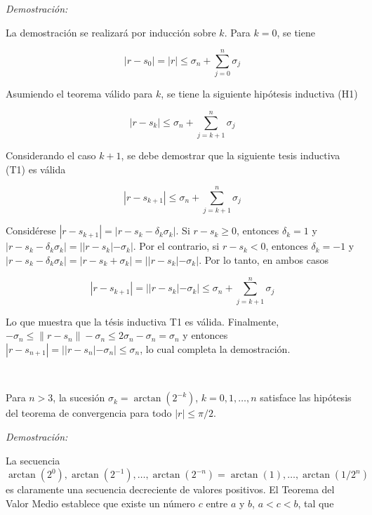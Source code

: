 \emph{Demostración:}

La demostración se realizará por inducción sobre $k$. Para $k=0$, se tiene

\begin{equation*}
|r-s_0|=|r| \le \sigma_{n}+\sum_{j=0}^{n}{\sigma_j}
\end{equation*}

Asumiendo el teorema válido para $k$, se tiene la siguiente hipótesis inductiva (H1)

\begin{equation*}
|r-s_k| \le \sigma_{n} + \sum_{j=k+1}^{n}{\sigma_j}
\end{equation*}

Considerando el caso $k+1$, se debe demostrar que la siguiente tesis inductiva (T1) es válida

\begin{equation*}
|r-s_{k+1}| \le \sigma_{n} + \sum_{j=k+1}^{n}{\sigma_j}
\end{equation*}

Considérese $|r-s_{k+1}|= |r-s_k-\delta_k\sigma_k|$. Si $r-s_k \ge 0$, entonces $\delta_k=1$ y
$|r-s_k-\delta_k\sigma_k|=||r-s_k|-\sigma_k|$. Por el contrario, si $r-s_k < 0$, entonces $\delta_k=-1$ y
$|r-s_k-\delta_k\sigma_k|=|r-s_k+\sigma_k|=||r-s_k|-\sigma_k|$. Por lo tanto, en ambos casos

\begin{equation*}
|r-s_{k+1}|=||r-s_k|-\sigma_k| \le \sigma_{n} + \sum_{j=k+1}^{n}{\sigma_j}
\end{equation*}

Lo que muestra que la tésis inductiva T1 es válida. Finalmente,
$-\sigma_n \le \|r-s_n\| - \sigma_n \le 2 \sigma_n-\sigma_n=\sigma_n$ y entonces
$|r-s_{n+1}|=| |r-s_n| - \sigma_n|\le \sigma_n$, lo cual completa la demostración.

\

\begin{teor}
Para $n>3$, la sucesión $\sigma_{k}=\arctan\left(2^{-k}\right)$, $k=0,1,\ldots,n$ satisface las hipótesis del teorema de
convergencia para todo $|r| \le \pi/2$.
\end{teor}

\emph{Demostración:}

La secuencia $\arctan\left(2^{0}\right),\arctan\left(2^{-1}\right),\ldots,\arctan\left(2^{-n}\right)=
\arctan\left(1\right),\ldots,\arctan\left(1/2^{n}\right)$ es claramente una secuencia decreciente de valores positivos.
 El Teorema del Valor Medio establece que existe un número $c$ entre $a$ y $b$, $a<c<b$, tal que

